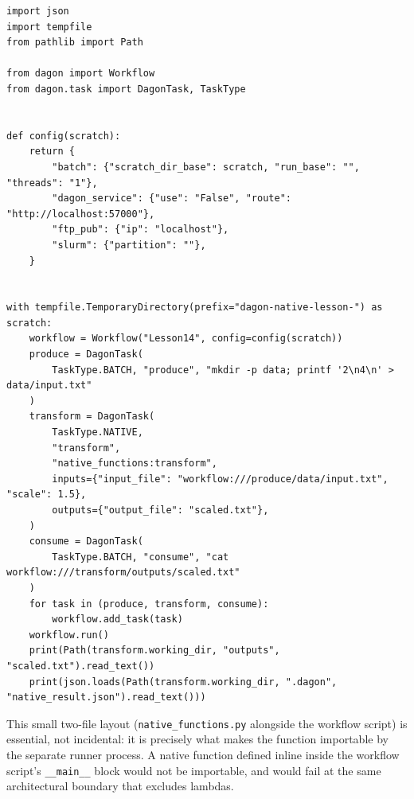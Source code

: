 \begin{lstlisting}[caption={\texttt{native\_workflow.py}: the workflow that calls it.}]
import json
import tempfile
from pathlib import Path

from dagon import Workflow
from dagon.task import DagonTask, TaskType


def config(scratch):
    return {
        "batch": {"scratch_dir_base": scratch, "run_base": "", "threads": "1"},
        "dagon_service": {"use": "False", "route": "http://localhost:57000"},
        "ftp_pub": {"ip": "localhost"},
        "slurm": {"partition": ""},
    }


with tempfile.TemporaryDirectory(prefix="dagon-native-lesson-") as scratch:
    workflow = Workflow("Lesson14", config=config(scratch))
    produce = DagonTask(
        TaskType.BATCH, "produce", "mkdir -p data; printf '2\n4\n' > data/input.txt"
    )
    transform = DagonTask(
        TaskType.NATIVE,
        "transform",
        "native_functions:transform",
        inputs={"input_file": "workflow:///produce/data/input.txt", "scale": 1.5},
        outputs={"output_file": "scaled.txt"},
    )
    consume = DagonTask(
        TaskType.BATCH, "consume", "cat workflow:///transform/outputs/scaled.txt"
    )
    for task in (produce, transform, consume):
        workflow.add_task(task)
    workflow.run()
    print(Path(transform.working_dir, "outputs", "scaled.txt").read_text())
    print(json.loads(Path(transform.working_dir, ".dagon", "native_result.json").read_text()))
\end{lstlisting}

\begin{practicebox}
This small two-file layout (\texttt{native\_functions.py} alongside the
workflow script) is essential, not incidental: it is precisely what makes the
function importable by the separate runner process. A native function
defined inline inside the workflow script's \texttt{\_\_main\_\_} block would
not be importable, and would fail at the same architectural boundary that
excludes lambdas.
\end{practicebox}

